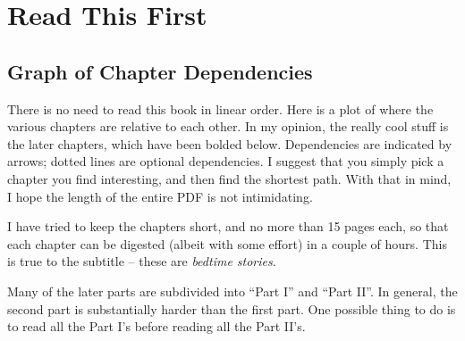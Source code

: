 \addtocounter{chapter}{-1}
\chapter{Read This First}
\section{Graph of Chapter Dependencies}
There is no need to read this book in linear order.
Here is a plot of where the various chapters are relative to each other.
In my opinion, the really cool stuff is the later chapters,
which have been bolded below.
Dependencies are indicated by arrows;
dotted lines are optional dependencies.
I suggest that you simply pick a chapter you find interesting,
and then find the shortest path.
With that in mind, I hope the length of the entire PDF is not intimidating.

I have tried to keep the chapters short, and no more than 15 pages each,
so that each chapter can be digested (albeit with some effort) in a couple of hours.
This is true to the subtitle -- these are \emph{bedtime stories}.


Many of the later parts are subdivided into ``Part I'' and ``Part II''.
In general, the second part is substantially harder than the first part.
One possible thing to do is to read all the Part I's before reading all the Part II's.


\eject

